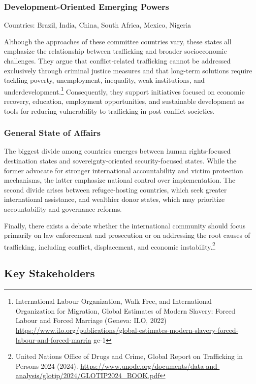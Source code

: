 \subsubsection{Development-Oriented Emerging Powers}

Countries: Brazil, India, China, South Africa, Mexico, Nigeria

Although the approaches of these committee countries vary, these states all emphasize the relationship between trafficking and broader socioeconomic challenges. They argue that conflict-related trafficking cannot be addressed exclusively through criminal justice measures and that long-term solutions require tackling poverty, unemployment, inequality, weak institutions, and underdevelopment.\footnote{International Labour Organization, Walk Free, and International Organization for Migration, Global Estimates of Modern Slavery: Forced Labour and Forced Marriage (Geneva: ILO, 2022) \url{https://www.ilo.org/publications/global-estimates-modern-slavery-forced-labour-and-forced-marria} ge-1} Consequently, they support initiatives focused on economic recovery, education, employment opportunities, and sustainable development as tools for reducing vulnerability to trafficking in post-conflict societies.

\subsubsection{General State of Affairs}

The biggest divide among countries emerges between human rights-focused  destination  states  and  sovereignty-oriented security-focused states. While the former advocate for stronger international accountability and victim protection mechanisms, the latter emphasize national control over implementation. The second divide arises between refugee-hosting countries, which seek greater international assistance, and wealthier donor states, which may prioritize accountability and governance reforms.

Finally, there exists a debate whether the international community should focus primarily on law enforcement and prosecution or on addressing the root causes of trafficking, including conflict, displacement, and economic instability.\footnote{United Nations Office of Drugs and Crime, Global Report on Trafficking in Persons 2024 (2024). \url{https://www.unodc.org/documents/data-and-analysis/glotip/2024/GLOTIP2024_BOOK.pdf}}

\subsection{Key Stakeholders}

